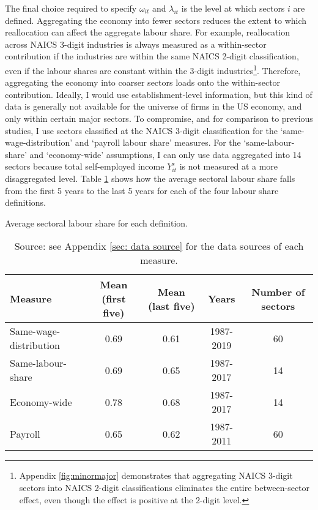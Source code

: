 The final choice required to specify $\omega_{it}$ and $\lambda_{it}$ is the level at which sectors $i$ are defined. Aggregating the economy into fewer sectors reduces the extent to which reallocation can affect the aggregate labour share. For example, reallocation across NAICS 3-digit industries is always measured as a within-sector contribution if the industries are within the same NAICS 2-digit classification, even if the labour shares are constant within the 3-digit industries\footnote{Appendix \ref{fig:minormajor} demonstrates that aggregating NAICS 3-digit sectors into NAICS 2-digit classifications eliminates the entire between-sector effect, even though the effect is positive at the 2-digit level.}. Therefore, aggregating the economy into coarser sectors loads onto the within-sector contribution. Ideally, I would use establishment-level information, but this kind of data is generally not available for the universe of firms in the US economy, and only within certain major sectors. To compromise, and for comparison to previous studies, I use sectors classified at the NAICS 3-digit classification for the `same-wage-distribution' and `payroll labour share' measures. For the `same-labour-share' and `economy-wide' assumptions, I can only use data aggregated into 14 sectors because total self-employed income $Y_{it}^{s}$ is not measured at a more disaggregated level. Table \ref{tab:data} shows how the average sectoral labour share falls from the first 5 years to the last 5 years for each of the four labour share definitions. 


\begingroup
\renewcommand*{\arraystretch}{1.3}

\begin{table}[h]
    \centering
    \small
    \caption{\normalsize Average sectoral labour share for each definition.}
    \begin{tabular}{l|cccc}
        
        \toprule[1.1pt]
        
        Measure & Mean (first five) & Mean (last five) & Years & Number of sectors \\

        \midrule[1.1pt]

        Same-wage-distribution & 0.69 & 0.61 & 1987-2019 & 60 \\

        Same-labour-share & 0.69 & 0.65 & 1987-2017 & 14 \\

        Economy-wide & 0.78 & 0.68 & 1987-2017 & 14 \\

        Payroll & 0.65 & 0.62 & 1987-2011 & 60 \\

        \bottomrule[1.1pt]
    \end{tabular}

\begin{minipage}{\linewidth}
\captionsetup{justification=raggedright,singlelinecheck=false}
    \caption*{Source: see Appendix \ref{sec: data source} for the data sources of each measure.}
\end{minipage}
    \label{tab:data}
\end{table}

\endgroup
